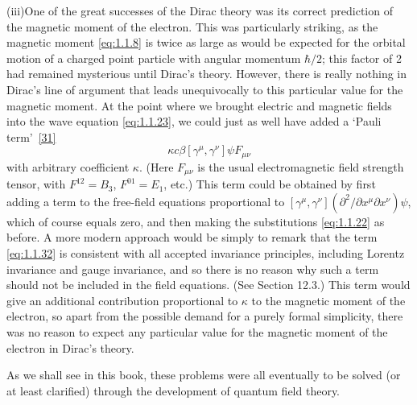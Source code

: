 \medskip
\noindent
(iii)\quad One of the great successes of the Dirac theory was its correct
prediction of the magnetic moment of the electron. This was particularly
striking, as the magnetic moment \eqref{eq:1.1.8} is twice as large as would be
expected for the orbital motion of a charged point particle with angular
momentum $\hbar/2$; this factor of 2 had remained mysterious until Dirac's
theory. However, there is really nothing in Dirac's line of argument that
leads unequivocally to this particular value for the magnetic moment. At
the point where we brought electric and magnetic fields into the wave
equation \eqref{eq:1.1.23}, we could just as well have added a `Pauli term'~\hyperref[ref:1.31]{[31]}
\begin{equation}
  \kappa c\beta[\gamma^\mu,\gamma^\nu]\psi F_{\mu\nu}
  \tag{1.1.32}\label{eq:1.1.32}
\end{equation}
with arbitrary coefficient $\kappa$. (Here $F_{\mu\nu}$ is the usual electromagnetic field
strength tensor, with $F^{12}=B_3$, $F^{01}=E_1$, etc.) This term could be
obtained by first adding a term to the free-field equations proportional
to $[\gamma^\mu,\gamma^\nu](\partial^2/\partial x^\mu\partial x^\nu)\psi$, which of course equals zero, and then making
the substitutions \eqref{eq:1.1.22} as before. A more modern approach would be
simply to remark that the term \eqref{eq:1.1.32} is consistent with all accepted
invariance principles, including Lorentz invariance and gauge invariance,
and so there is no reason why such a term should not be included in the
field equations. (See Section 12.3.) This term would give an additional
contribution proportional to $\kappa$ to the magnetic moment of the electron, so
apart from the possible demand for a purely formal simplicity, there was
no reason to expect any particular value for the magnetic moment of the
electron in Dirac's theory.

As we shall see in this book, these problems were all eventually to be
solved (or at least clarified) through the development of quantum field
theory.
